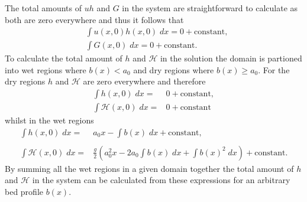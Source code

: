 The total amounts of $uh$ and $G$ in the system are straightforward to calculate as both are zero everywhere and thus it follows that
\begin{align*}
&\int u(x,0)h(x,0) \;  dx = {} 0 + \text{constant}, \\
&\int G(x,0) \; dx = {} 0 + \text{constant}.
\end{align*}
To calculate the total amount of $h$ and $\mathcal{H}$ in the solution the domain is partioned into wet regions where $b(x) < a_0$ and dry regions where $b(x) \ge a_0$. For the dry regions $h$ and $\mathcal{H}$ are zero everywhere and therefore 
	\begin{align*}
	\int h(x,0) \; dx = {} & 0 + \text{constant} , \\
	\int \mathcal{H}(x,0) \; dx = {} & 0 + \text{constant}
	\end{align*}
whilst in the wet regions
\begin{subequations}
	\label{eqn:AppLARhwet}
	\begin{align}
	\int h(x,0) \; dx = {} & a_0 x -  \int b(x) \; dx  + \text{constant}, \\  \nonumber \\
	\int \mathcal{H}(x,0) \; dx = {} & \frac{g}{2} \left(a_0^2x  -  2a_0 \int b(x) \; dx + \int b(x)^2 \; dx \right) + \text{constant}.
	\end{align}
\end{subequations}
By summing all the wet regions in a given domain together the total amount of $h$ and $\mathcal{H}$ in the system can be calculated from these expressions for an arbitrary bed profile $b(x)$. 
